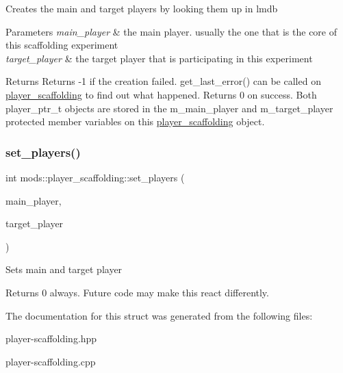Creates the main and target players by looking them up in lmdb 
\begin{DoxyParams}{Parameters}
{\em main\+\_\+player} & the main player. usually the one that is the core of this scaffolding experiment \\
\hline
{\em target\+\_\+player} & the target player that is participating in this experiment \\
\hline
\end{DoxyParams}
\begin{DoxyReturn}{Returns}
Returns -\/1 if the creation failed. get\+\_\+last\+\_\+error() can be called on \hyperlink{structmods_1_1player__scaffolding}{player\+\_\+scaffolding} to find out what happened. Returns 0 on success. Both player\+\_\+ptr\+\_\+t objects are stored in the m\+\_\+main\+\_\+player and m\+\_\+target\+\_\+player protected member variables on this \hyperlink{structmods_1_1player__scaffolding}{player\+\_\+scaffolding} object. 
\end{DoxyReturn}
\mbox{\label{structmods_1_1player__scaffolding_a784d255d6d870ef95e00fdcaa8760824}} 
\subsubsection{\texorpdfstring{set\+\_\+players()}{set\_players()}\hspace{0.1cm}{\footnotesize\ttfamily [3/3]}}
{\footnotesize\ttfamily int mods\+::player\+\_\+scaffolding\+::set\+\_\+players (\begin{DoxyParamCaption}\item[{player\+\_\+ptr\+\_\+t}]{main\+\_\+player,  }\item[{player\+\_\+ptr\+\_\+t}]{target\+\_\+player }\end{DoxyParamCaption})}

Sets main and target player \begin{DoxyReturn}{Returns}
0 always. Future code may make this react differently. 
\end{DoxyReturn}


The documentation for this struct was generated from the following files\+:\begin{DoxyCompactItemize}
\item 
player-\/scaffolding.\+hpp\item 
player-\/scaffolding.\+cpp\end{DoxyCompactItemize}
